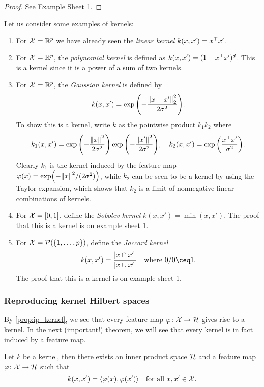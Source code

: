 \begin{proof}
    See Example Sheet 1. 
\end{proof}

\begin{example} Let us consider some examples of kernels:
    \begin{enumerate}
        \item For $\mathcal X = \mathbb R^p$ we have already seen the \emph{linear kernel} $k(x, x') = x^\top x'$. 
        \item For $\mathcal X = \mathbb R^p$, the \emph{polynomial kernel} is defined as $k(x, x') = (1 + x^\top x')^d$. This is a kernel since it is a power of a sum of two kernels. 
        \item For $\mathcal X = \mathbb R^p$, the \emph{Gaussian kernel} is defined by
        \[
        k(x, x') = \exp\qty( - \frac{\norm{x - x'}_2^2}{2\sigma^2}).
        \]
        To show this is a kernel, write $k$ as the pointwise product $k_1k_2$ where
        \[
        k_1(x, x') = \exp\qty(-\frac{\norm{x}^2}{2\sigma^2}) \exp\qty(-\frac{\norm{x'}^2}{2\sigma^2}), \quad k_2(x, x') = \exp\qty(\frac{x^\top x'}{\sigma^2}). 
        \]
        Clearly $k_1$ is the kernel induced by the feature map $\varphi(x) = \exp(-\norm{x}^2/(2\sigma^2))$, while $k_2$ can be seen to be a kernel by using the Taylor expansion, which shows that $k_2$ is a limit of nonnegative linear combinations of kernels. 
        
        \item For $\mathcal X = [0, 1]$, define the \emph{Sobolev kernel} $k(x, x') = \min(x, x')$. The proof that this is a kernel is on example sheet 1. 
        \item For $\mathcal X = \mathcal P(\qty{1, \dotsc, p})$, define the \emph{Jaccard kernel}
        \[
        k(x, x') = \frac{\abs{x \cap x'}}{\abs{x \cup x'}} \quad\text{where $0/0 \ceq 1$}. 
        \]
        The proof that this is a kernel is on example sheet 1. 
    \end{enumerate}
\end{example}

\subsubsection{Reproducing kernel Hilbert spaces}
By \cref{prop:ip_kernel}, we see that every feature map $\varphi \colon \mathcal X \to \mathcal H$ gives rise to a kernel. In the next (important!) theorem, we will see that every kernel is in fact induced by a feature map.

\begin{theorem} \label{thm:kernel_ip} 
    Let $k$ be a kernel, then there exists an inner product space $\mathcal H$ and a feature map $\varphi \colon \mathcal X \to \mathcal H$ such that 
    \[
    k(x, x') = \langle\varphi(x), \varphi(x')\rangle \quad\text{for all $x, x' \in \mathcal X$}. 
    \]
\end{theorem}

